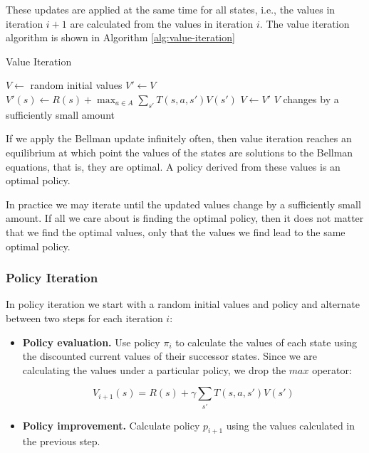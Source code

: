 These updates are applied at the same time for all states, i.e., the values in iteration $i+1$ are calculated from the values in iteration $i$. The value iteration algorithm is shown in Algorithm \ref{alg:value-iteration}


\begin{algorithm}
  \caption{Value Iteration}\label{alg:value-iteration}
  \begin{algorithmic}
    \State $V \gets$ random initial values
    \Repeat
      \State $V' \gets V$
        \State $V'(s) \gets R(s) + \max_{a \in A} \sum_{s'} T(s, a, s') V(s')$
      \EndFor
      \State $V \gets V'$
    \Until $V$ changes by a sufficiently small amount
  \end{algorithmic}
\end{algorithm}

If we apply the Bellman update infinitely often, then value iteration reaches an equilibrium at which point the values of the states are solutions to the Bellman equations, that is, they are optimal. A policy derived from these values is an optimal policy.

In practice we may iterate until the updated values change by a sufficiently small amount. If all we care about is finding the optimal policy, then it does not matter that we find the optimal values, only that the values we find lead to the same optimal policy.

\subsubsection{Policy Iteration}

In policy iteration \cite{howard1960dynamic} we start with a random initial values and policy and alternate between two steps for each iteration $i$:

\begin{itemize}
\item {\bf Policy evaluation.} Use policy $\pi_i$ to calculate the values of each state using the discounted current values of their successor states. Since we are calculating the values under a particular policy, we drop the $max$ operator:

  \begin{equation}
  V_{i+1}(s) = R(s) + \gamma \sum_{s'} T(s, a, s') V(s')
  \end{equation}

\item {\bf Policy improvement.} Calculate policy $p_{i+1}$ using the values calculated in the previous step.
\end{itemize}

